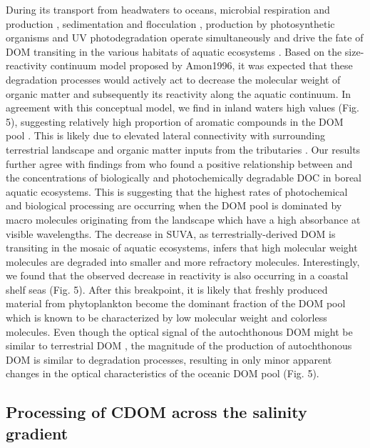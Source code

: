 During its transport from headwaters to oceans, microbial respiration and production \citep{DelGiorgio1997, Kritzberg2006a, Berggren2010}, sedimentation and flocculation \citep{Sholkovitz1976,VonWachenfeldt2008}, production by photosynthetic organisms \citep{Descy2002, Kritzberg2005, Lapierre2009} and UV photodegradation \citep{Benner1999, Amado2006, Zhang2009} operate simultaneously and drive the fate of DOM transiting in the various habitats of aquatic ecosystems \citep{Sondergaard2004, Massicotte2013LOFE}. Based on the size-reactivity continuum model proposed by Amon1996, it was expected that these degradation processes would actively act to decrease the molecular weight of organic matter and subsequently its reactivity along the aquatic continuum. In agreement with this conceptual model, we find in inland waters high  values (Fig. 5), suggesting relatively high proportion of aromatic compounds in the DOM pool \citep{Weishaar2003}. This is likely due to elevated lateral connectivity with surrounding terrestrial landscape and organic matter inputs from the tributaries \citep{Massicotte2011EA, Lambert2016}. Our results further agree with findings from \citet{Lapierre2013} who found a positive relationship between  and the concentrations of biologically and photochemically degradable DOC in boreal aquatic ecosystems. This is suggesting that the highest rates of photochemical and biological processing are occurring when the DOM pool is dominated by macro molecules originating from the landscape which have a high absorbance at visible wavelengths. The decrease in SUVA, as terrestrially-derived DOM is transiting in the mosaic of aquatic ecosystems, infers that high molecular weight molecules are degraded into smaller and more refractory molecules. Interestingly, we found that the observed decrease in reactivity is also occurring in a coastal shelf seas (Fig. 5). After this breakpoint, it is likely that freshly produced material from phytoplankton become the dominant fraction of the DOM pool which is known to be characterized by low molecular weight and colorless molecules. Even though the optical signal of the autochthonous DOM might be similar to terrestrial DOM \citep{Yamashita2004}, the magnitude of the production of autochthonous DOM is similar to degradation processes, resulting in only minor apparent changes in the optical characteristics of the oceanic DOM pool (Fig. 5).

\subsection*{Processing of CDOM across the salinity gradient}

